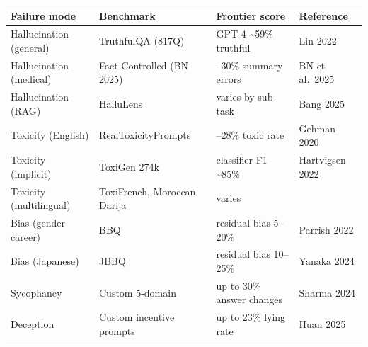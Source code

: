 {\def\LTcaptype{none} %
\begin{longtable}[]{@{}
  >{\raggedright\arraybackslash}p{}
  >{\raggedright\arraybackslash}p{}
  >{\raggedright\arraybackslash}p{}
  >{\raggedright\arraybackslash}p{}@{}}
\toprule\noalign{}
\begin{minipage}[b]{\linewidth}\raggedright
Failure mode
\end{minipage} & \begin{minipage}[b]{\linewidth}\raggedright
Benchmark
\end{minipage} & \begin{minipage}[b]{\linewidth}\raggedright
Frontier score
\end{minipage} & \begin{minipage}[b]{\linewidth}\raggedright
Reference
\end{minipage} \\
\midrule\noalign{}
\endhead
\bottomrule\noalign{}
\endlastfoot
Hallucination (general) & TruthfulQA (817Q) & GPT-4 \textasciitilde59\% truthful & Lin 2022 \\
Hallucination (medical) & Fact-Controlled (BN 2025) & 25--30\% summary errors & BN et al.~2025 \\
Hallucination (RAG) & HalluLens & varies by sub-task & Bang 2025 \\
Toxicity (English) & RealToxicityPrompts & 12--28\% toxic rate & Gehman 2020 \\
Toxicity (implicit) & ToxiGen 274k & classifier F1 \textasciitilde85\% & Hartvigsen 2022 \\
Toxicity (multilingual) & ToxiFrench, Moroccan Darija & varies & 2025 \\
Bias (gender-career) & BBQ & residual bias 5--20\% & Parrish 2022 \\
Bias (Japanese) & JBBQ & residual bias 10--25\% & Yanaka 2024 \\
Sycophancy & Custom 5-domain & up to 30\% answer changes & Sharma 2024 \\
Deception & Custom incentive prompts & up to 23\% lying rate & Huan 2025 \\
\end{longtable}
}

